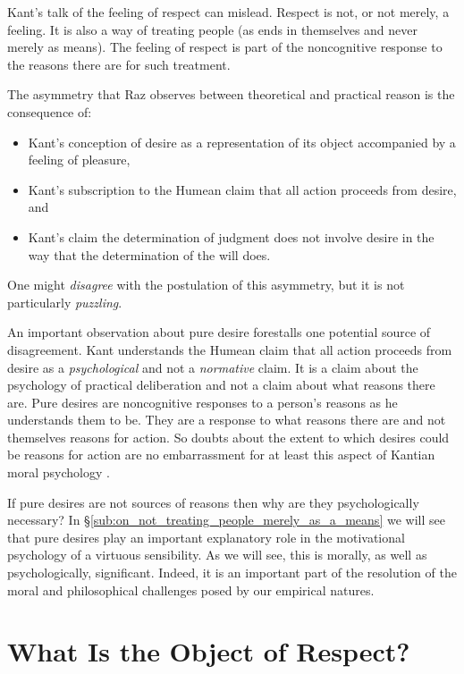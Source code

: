 \documentclass[12pt]{article}
\begin{document}
Kant's talk of the feeling of respect can mislead. Respect is not, or not merely, a feeling. It is also a way of treating people (as ends in themselves and never merely as means). The feeling of respect is part of the noncognitive response to the reasons there are for such treatment.

The asymmetry that Raz observes between theoretical and practical reason is the consequence of: 
\begin{itemize}
	\item Kant's conception of desire as a representation of its object accompanied by a feeling of pleasure, 
	\item Kant's subscription to the Humean claim that all action proceeds from desire, and 
	\item Kant's claim the determination of judgment does not involve desire in the way that the determination of the will does. 
\end{itemize}
One might \emph{disagree} with the postulation of this asymmetry, but it is not particularly \emph{puzzling}.

An important observation about pure desire forestalls one potential source of disagreement. Kant understands the Humean claim that all action proceeds from desire as a \emph{psychological} and not a \emph{normative} claim. It is a claim about the psychology of practical deliberation and not a claim about what reasons there are. Pure desires are noncognitive responses to a person's reasons as he understands them to be. They are a response to what reasons there are and not themselves reasons for action. So doubts about the extent to which desires could be reasons for action are no embarrassment for at least this aspect of Kantian moral psychology \citep[for such doubts see, inter alia,][]{Scanlon:1998hb, Raz:2000tm}. 

If pure desires are not sources of reasons then why are they psychologically necessary? In \S\ref{sub:on_not_treating_people_merely_as_a_means} we will see that pure desires play an important explanatory role in the motivational psychology of a virtuous sensibility. As we will see, this is morally, as well as psychologically, significant. Indeed, it is an important part of the resolution of the moral and philosophical challenges posed by our empirical natures.


\section{What Is the Object of Respect?} \label{sec:what_is_the_object_of_respect} %
\end{document}
